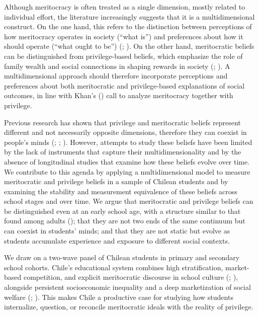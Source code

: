 \documentclass[
  11pt,
]{article}
\begin{document}
Although meritocracy is often treated as a single dimension, mostly
related to individual effort, the literature increasingly suggests that
it is a multidimensional construct. On the one hand, this refers to the
distinction between perceptions of how meritocracy operates in society
(``what is'') and preferences about how it should operate (``what ought
to be'') (; ). On the other hand, meritocratic beliefs can be distinguished
from privilege-based beliefs, which emphasize the role of family wealth
and social connections in shaping rewards in society
(;
). A
multidimensional approach should therefore incorporate perceptions and
preferences about both meritocratic and privilege-based explanations of
social outcomes, in line with Khan's
() call to analyze meritocracy
together with privilege.

Previous research has shown that privilege and meritocratic beliefs
represent different and not necessarily opposite dimensions, therefore
they can coexist in people's minds
(;
;
). However,
attempts to study these beliefs have been limited by the lack of
instruments that capture their multidimensionality and by the absence of
longitudinal studies that examine how these beliefs evolve over time. We
contribute to this agenda by applying a multidimensional model to
measure meritocratic and privilege beliefs in a sample of Chilean
students and by examining the stability and measurement equivalence of
these beliefs across school stages and over time. We argue that
meritocratic and privilege beliefs can be distinguished even at an early
school age, with a structure similar to that found among adults
();
that they are not two ends of the same continuum but can coexist in
students' minds; and that they are not static but evolve as students
accumulate experience and exposure to different social contexts.

We draw on a two-wave panel of Chilean students in primary and secondary
school cohorts. Chile's educational system combines high stratification,
market-based competition, and explicit meritocratic discourse in school
culture (; ), alongside persistent socioeconomic inequality and a deep
marketization of social welfare
(;
). This makes Chile
a productive case for studying how students internalize, question, or
reconcile meritocratic ideals with the reality of privilege.
\end{document}
